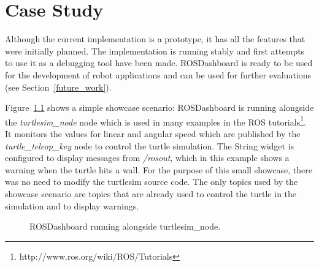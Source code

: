\chapter{Case Study}


Although the current implementation is a prototype, it has all the features that were initially planned. The implementation is running stably and first attempts to use it as a debugging tool have been made. ROSDashboard is ready to be used for the development of robot applications and can be used for further evaluations (see Section~\ref{future_work}).

Figure~\ref{showcase} shows a simple showcase scenario: ROSDashboard is running alongside the \emph{turtlesim\_node} node which is used in many examples in the ROS tutorials\footnote{http://www.ros.org/wiki/ROS/Tutorials}. It monitors the values for linear and angular speed which are published by the \emph{turtle\_teleop\_key} node to control the turtle simulation. The String widget is configured to display messages from \emph{/rosout}, which in this example shows a warning when the turtle hits a wall.
For the purpose of this small showcase, there was no need to modify the turtlesim source code. The only topics used by the showcase scenario are topics that are already used to control the turtle in the simulation and to display warnings.

\begin{figure}[thpb]
  \centering
  \caption{ROSDashboard running alongside turtlesim\_node.}
  \label{showcase}
\end{figure}

